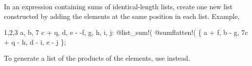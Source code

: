 
In an expression containing sums of identical-length lists, create one
new list constructed by adding the elements at the same position in
each list. Example,
\begin{screen}{1,2,3}
{a, b, 7 c + q, d, e} - {-f, g, h, i, j}:
@list_sum!(%
@sumflatten!(%
\{ a + f, b - g, 7c + q - h, d - i, e - j \};
\end{screen}
To generate a list of the products of the elements,
use  instead.

